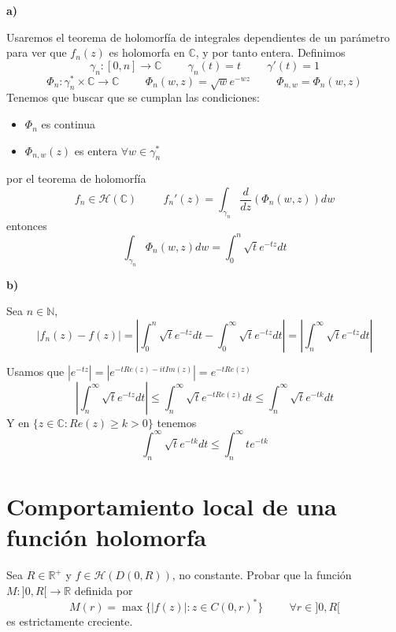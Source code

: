 \begin{sol}
	
	\textbf{a)}
	
	Usaremos el teorema de holomorfía de integrales dependientes de un parámetro para ver que $f_n(z)$ es holomorfa en $\mathbb{C}$, y por tanto entera.
	Definimos
	$$\gamma_n :[0,n] \rightarrow \mathbb{C} \hspace{1cm} \gamma_n(t)=t \hspace{1cm} \gamma'(t) = 1$$
	$$\Phi_n : \gamma_n^{\ast}\times\mathbb{C} \rightarrow \mathbb{C} \hspace{1cm} \Phi_n(w,z) = \sqrt{w}e^{-wz} \hspace{1cm} \Phi_{n,w} = \Phi_n(w,z)$$
	Tenemos que buscar que se cumplan las condiciones:
	\begin{itemize}
		\item $\Phi_n$ es continua
		\item $\Phi_{n,w}(z)$ es entera $\forall w\in\gamma_n^{\ast}$
	\end{itemize}
	
	por el teorema de holomorfía
	$$f_n \in\mathcal{H}(\mathbb{C}) \hspace{1cm}f_n'(z) = \int_{\gamma_n} \frac{d}{dz} (\Phi_n(w,z)) dw$$
	entonces
	$$\int_{\gamma_n}\Phi_n(w,z) dw = \int_0^n \sqrt{t}e^{-tz} dt$$
	
	
	\textbf{b)}
	
	Sea $n\in\mathbb{N}$,
	$$|f_n(z) - f(z)| = |\int_{0}^{n} \sqrt{t} e^{-tz}dt - \int_{0}^{\infty} \sqrt{t}e^{-tz}dt| = |\int_{n}^{\infty} \sqrt{t} e^{-tz}dt|$$
	
	Usamos que 
	$|e^{-tz}| = |e^{-tRe(z)-itIm(z)}| = e^{-tRe(z)}$
	$$|\int_{n}^{\infty} \sqrt{t} e^{-tz}dt| \leq \int_{n}^{\infty} \sqrt{t}e^{-tRe(z)} dt \leq \int_{n}^{\infty} \sqrt{t}e^{-tk}dt $$
	Y en $\{ z\in\mathbb{C} : Re(z)\geq k > 0 \}$ tenemos
	$$ \int_{n}^{\infty} \sqrt{t}e^{-tk} dt \leq \int_{n}^{\infty} te^{-tk}$$
\end{sol}

\newpage

\section{Comportamiento local de una función holomorfa}
\begin{ejer}
	Sea $R\in\mathbb{R}^+$ y $f\in\mathcal{H}(D(0,R))$, no constante.
	Probar que la función $M : ]0,R[\rightarrow\mathbb{R}$ definida por
	$$ M(r) = \max\{ |f(z)| : z\in C(0,r)^{\ast} \} \hspace{1cm} \forall r\in ]0,R[ $$
	es estrictamente creciente.
\end{ejer}

